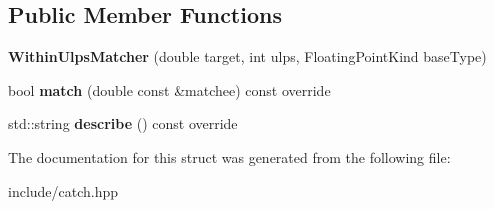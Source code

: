 \subsection*{Public Member Functions}
\begin{DoxyCompactItemize}
\item 
{\bfseries Within\+Ulps\+Matcher} (double target, int ulps, Floating\+Point\+Kind base\+Type)\hypertarget{structCatch_1_1Matchers_1_1Floating_1_1WithinUlpsMatcher_a836074ae4010275284ab66b2485c6575}{}\label{structCatch_1_1Matchers_1_1Floating_1_1WithinUlpsMatcher_a836074ae4010275284ab66b2485c6575}

\item 
bool {\bfseries match} (double const \&matchee) const override\hypertarget{structCatch_1_1Matchers_1_1Floating_1_1WithinUlpsMatcher_aabda42a0dc5d00f3c5916feb75006b32}{}\label{structCatch_1_1Matchers_1_1Floating_1_1WithinUlpsMatcher_aabda42a0dc5d00f3c5916feb75006b32}

\item 
std\+::string {\bfseries describe} () const override\hypertarget{structCatch_1_1Matchers_1_1Floating_1_1WithinUlpsMatcher_ad9bc8bb7f3abd326580a4bf6cf369b1b}{}\label{structCatch_1_1Matchers_1_1Floating_1_1WithinUlpsMatcher_ad9bc8bb7f3abd326580a4bf6cf369b1b}

\end{DoxyCompactItemize}


The documentation for this struct was generated from the following file\+:\begin{DoxyCompactItemize}
\item 
include/catch.\+hpp\end{DoxyCompactItemize}
